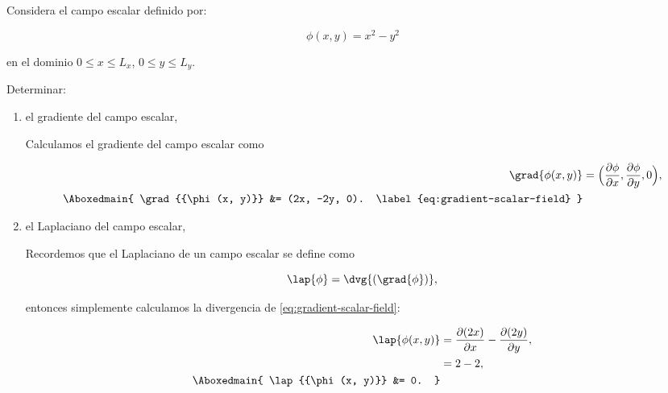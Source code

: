 \documentclass[./../main.tex]{subfiles}
\begin{document}
    \section{}
    
    Considera el campo escalar definido por:

    \begin{equation*}
        \phi(x, y) = x^{2} - y^{2}
    \end{equation*}

    en el dominio \(0 \leq x \leq L_{x}\), \(0 \leq y \leq L_{y}\).

    Determinar:

    \begin{enumerate}[label=\arabic*)]
        \item el gradiente del campo escalar,
        
        Calculamos el gradiente del campo escalar como

        \begin{align}
            \grad{{\phi(x, y)}} &= \Bigl( \pdv{\phi}{x}, \pdv{\phi}{y}, 0\Bigr),\nonumber\\
            \Aboxedmain{
                \grad{{\phi(x, y)}} &= (2x, -2y, 0).
                \label{eq:gradient-scalar-field}
            }
        \end{align}
        
        \item el Laplaciano del campo escalar,
        
        Recordemos que el Laplaciano de un campo escalar se define como

        \begin{equation*}
            \lap{\phi} = \dvg{(\grad{\phi})},
        \end{equation*}

        entonces simplemente calculamos la divergencia de \cref{eq:gradient-scalar-field}:

        \begin{align*}
            \lap{{\phi(x, y)}} &= \pdv{(2x)}{x} - \pdv{(2y)}{y},\\
            &= 2 - 2,\\
            \Aboxedmain{
                \lap{{\phi(x, y)}} &= 0.
            }
        \end{align*}
    \end{enumerate}
\end{document}
